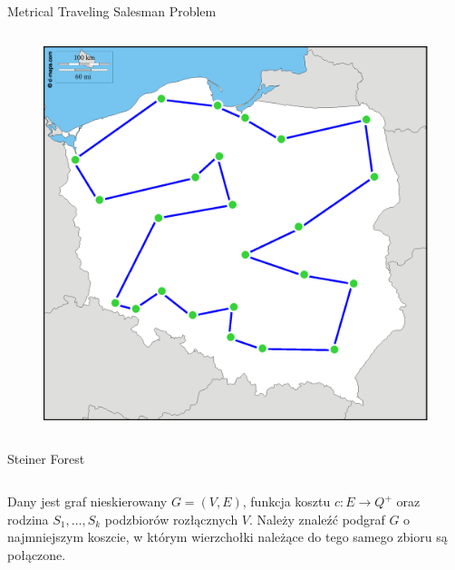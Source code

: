 \documentclass[final,hyperref={pdfpagelabels=false}]{beamer}
\begin{document}
\begin{frame}
\begin{columns}
\begin{column}{.46\textwidth}
\begin{block}{Metrical Traveling Salesman Problem}
\begin{minipage}{\linewidth}
\begin{columns}
            \begin{column}{.58\linewidth}
              \begin{figure}
                \centering
                \includegraphics[width=0.8\linewidth]{poland_cities_cycle}
              \end{figure}
            \end{column}

          \end{columns}
        \end{minipage}
      \end{block}
      \hspace*{ 5cm }
      \begin{block}{Steiner Forest}
        \begin{minipage}{\linewidth}
          \begin{columns}
            \begin{column}{.58\linewidth}
              Dany jest graf nieskierowany $G = (V, E)$, funkcja kosztu $c: E \rightarrow Q^+$ oraz rodzina $S_1, \hdots, S_k$ podzbiorów rozłącznych $V$.
              Należy znaleźć podgraf $G$ o najmniejszym koszcie, w którym wierzchołki należące do tego samego zbioru są połączone.
            \end{column}


\end{columns}
\end{minipage}
\end{block}
\end{column}
\end{columns}
\end{frame}
\end{document}
